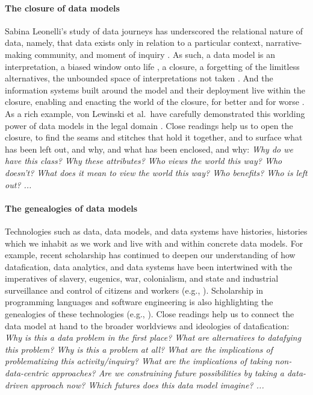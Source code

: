 \paragraph{The closure of data models}  
Sabina Leonelli's study of data journeys has underscored the relational nature of data, namely, that data exists only in relation to a particular context, narrative-making community, and moment of inquiry
\cite{datajourney,Leonelli2015}.
As such, a data model is an interpretation, a biased window onto life \cite{feinberg,maleve}, a closure, a forgetting of the limitless alternatives, the unbounded space of interpretations not taken \cite{parrish,onuoha,azoulay,sherman}.  
And the information systems built around the model and their deployment live within the closure,  enabling and enacting the world of the closure, for better and for worse \cite{ansorge,bopp,martin,LewinskiBS24}.
As a rich example, von Lewinski et al.\ have carefully demonstrated this worlding power of data models in the legal domain \cite{LewinskiBS24}.
Close readings help us to open the closure, to find the seams and stitches that hold it together, and to surface what has been left out, and why, and what has been enclosed, and why:
{\em Why do we have this class?  Why these attributes?  Who views the world this way?  Who doesn't?  What does it mean to view the world this way?  Who benefits?  Who is left out? ...}

\paragraph{The genealogies of data models} 
Technologies such as data, data models, and data systems have histories, histories which we inhabit as we work and live with and within concrete data models.  For example, recent scholarship has continued to deepen our understanding of how datafication, data analytics, and data systems have been intertwined with the imperatives of slavery, eugenics, war, colonialism, and state and industrial surveillance and control of citizens and workers (e.g.,  \cite{penn,valdivia,whittaker,wiggins}). 
Scholarship in programming languages and software engineering is also highlighting the genealogies of these technologies (e.g., \cite{parrish,hermans}).   Close readings help us to connect the data model at hand to the broader worldviews and ideologies of datafication: 
{\em Why is this a data problem in the first place?  What are alternatives to datafying this problem?  Why is this a problem at all?  What are the implications of problematizing this activity/inquiry?  What are the implications of taking non-data-centric approaches?  Are we constraining future possibilities by taking a data-driven approach now? Which futures does this data model imagine? ...}

